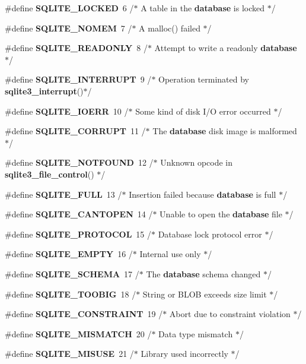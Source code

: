 \begin{DoxyCompactItemize}
\item 
\#define \textbf{ S\+Q\+L\+I\+T\+E\+\_\+\+L\+O\+C\+K\+ED}~6   /$\ast$ A table in the \textbf{ database} is locked $\ast$/
\item 
\#define \textbf{ S\+Q\+L\+I\+T\+E\+\_\+\+N\+O\+M\+EM}~7   /$\ast$ A malloc() failed $\ast$/
\item 
\#define \textbf{ S\+Q\+L\+I\+T\+E\+\_\+\+R\+E\+A\+D\+O\+N\+LY}~8   /$\ast$ Attempt to write a readonly \textbf{ database} $\ast$/
\item 
\#define \textbf{ S\+Q\+L\+I\+T\+E\+\_\+\+I\+N\+T\+E\+R\+R\+U\+PT}~9   /$\ast$ Operation terminated by \textbf{ sqlite3\+\_\+interrupt}()$\ast$/
\item 
\#define \textbf{ S\+Q\+L\+I\+T\+E\+\_\+\+I\+O\+E\+RR}~10   /$\ast$ Some kind of disk I/O error occurred $\ast$/
\item 
\#define \textbf{ S\+Q\+L\+I\+T\+E\+\_\+\+C\+O\+R\+R\+U\+PT}~11   /$\ast$ The \textbf{ database} disk image is malformed $\ast$/
\item 
\#define \textbf{ S\+Q\+L\+I\+T\+E\+\_\+\+N\+O\+T\+F\+O\+U\+ND}~12   /$\ast$ Unknown opcode in \textbf{ sqlite3\+\_\+file\+\_\+control}() $\ast$/
\item 
\#define \textbf{ S\+Q\+L\+I\+T\+E\+\_\+\+F\+U\+LL}~13   /$\ast$ Insertion failed because \textbf{ database} is full $\ast$/
\item 
\#define \textbf{ S\+Q\+L\+I\+T\+E\+\_\+\+C\+A\+N\+T\+O\+P\+EN}~14   /$\ast$ Unable to open the \textbf{ database} file $\ast$/
\item 
\#define \textbf{ S\+Q\+L\+I\+T\+E\+\_\+\+P\+R\+O\+T\+O\+C\+OL}~15   /$\ast$ Database lock protocol error $\ast$/
\item 
\#define \textbf{ S\+Q\+L\+I\+T\+E\+\_\+\+E\+M\+P\+TY}~16   /$\ast$ Internal use only $\ast$/
\item 
\#define \textbf{ S\+Q\+L\+I\+T\+E\+\_\+\+S\+C\+H\+E\+MA}~17   /$\ast$ The \textbf{ database} schema changed $\ast$/
\item 
\#define \textbf{ S\+Q\+L\+I\+T\+E\+\_\+\+T\+O\+O\+B\+IG}~18   /$\ast$ String or B\+L\+OB exceeds size limit $\ast$/
\item 
\#define \textbf{ S\+Q\+L\+I\+T\+E\+\_\+\+C\+O\+N\+S\+T\+R\+A\+I\+NT}~19   /$\ast$ Abort due to constraint violation $\ast$/
\item 
\#define \textbf{ S\+Q\+L\+I\+T\+E\+\_\+\+M\+I\+S\+M\+A\+T\+CH}~20   /$\ast$ Data type mismatch $\ast$/
\item 
\#define \textbf{ S\+Q\+L\+I\+T\+E\+\_\+\+M\+I\+S\+U\+SE}~21   /$\ast$ Library used incorrectly $\ast$/

\end{DoxyCompactItemize}
